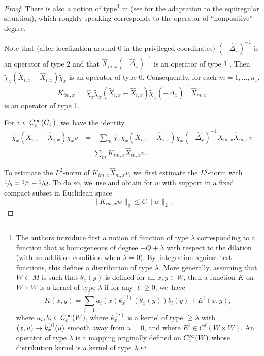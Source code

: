 \documentclass[11pt]{article}
\newcommand\mto{\mathchoice{\longmapsto}{\mapsto}{\mapsto}{\mapsto}}
\let\oldsfrac\sfrac
\renewcommand{\sfrac}[2]{{\oldsfrac{#1}{#2}}}
\newcommand{\rc}{\textup{c}}
\theoremstyle{definition}
\newcommand{\1}{\mathbbm{1}}
\numberwithin{equation}{section}
\begin{document}
\begin{proof}
There is also a notion of type\footnote{The authors introduce first a notion of function of type $\lambda$ corresponding to a function that is homogeneous of degree $-Q +\lambda$ with respect to the dilation (with an addition condition when $\lambda=0$). By~integration against test functions, this defines a distribution of type $\lambda$. More generally, assuming that $W\subset M$ is such that $\theta_x(y)$ is defined for all $x,y\in W$, then a function $K$ on $W\times W$ is a kernel of type $\lambda$ if for any $\ell \geq 0$, we~have
\[
K(x,y) = \sum_{i=1}^s a_i(x) k_x^{(i)} (\theta_x(y)) b_i(y) + E^\ell (x,y),
\]
where $a_i, b_i \in C_\rc^\infty(W)$, where $k_x^{(i)}$ is a kernel of type $\geq \lambda$ with $(x,u)\mto k_x^{(i)}(u)$ smooth away from $u=0$, and where $E^\ell \in C^\ell(W \times W)$. An operator of type $\lambda$ is a mapping originally defined on $C_\rc^\infty(W)$ whose distribution kernel is a kernel of type $\lambda$.}
in \cite{RS} (see \cite[pp.\,654--655]{Rot} for the adaptation to the equiregular situation), which roughly speaking corresponds to the operator of ``nonpositive'' degree.

Note that (after localization around $0$ in the privileged coordinates) $(-\widehat \Delta_x)^{-1}$ is an operator of type 2 and that $\widehat X_{m,x}(-\widehat \Delta_x)^{-1} $ is an operator of type $1$ \cite[Th.\,8]{RS}. Then $\tilde \chi_x (\tilde X_{i,x} -\widehat X_{i,x}) \tilde\chi_x$ is an operator of type 0. Consequently, for each $m=1,\ldots,n_1$,
\[
K_{im,x} := \widehat \chi_x \tilde \chi_x (\tilde X_{i,x} -\widehat X_{i,x}) \tilde\chi_x (-\widehat \Delta_x)^{-1} \widehat X_{m,x}
\]
is an operator of type 1.

For $v \in C_\rc^\infty (G_x)$, we~have the identity
\begin{align*}
\widehat \chi_x (\tilde X_{i,x} -\widehat X_{i,x}) \tilde\chi_x v & = - \sum_m \widehat \chi_x \tilde \chi_x (\tilde X_{i,x} -\widehat X_{i,x}) \tilde\chi_x (-\widehat \Delta_x)^{-1} \widehat X_{m,x} \widehat X_{m,x} v \\
& = \sum_m K_{im,x} \widehat X_{m,x} v.
\end{align*}

To estimate the $L^2$-norm of $ K_{im,x} \widehat X_{m,x} v$, we~first estimate the $L^q$-norm with $\sfrac 1q = \sfrac 12 - \sfrac 1Q$. To do so, we~use \cite[Th.\,7]{RS} and obtain for $w$ with support in a fixed compact subset in Euclidean space
\[
\| K_{im,x} w \|_q \leq C \| w \|_2.
\]


\end{proof}
\end{document}
